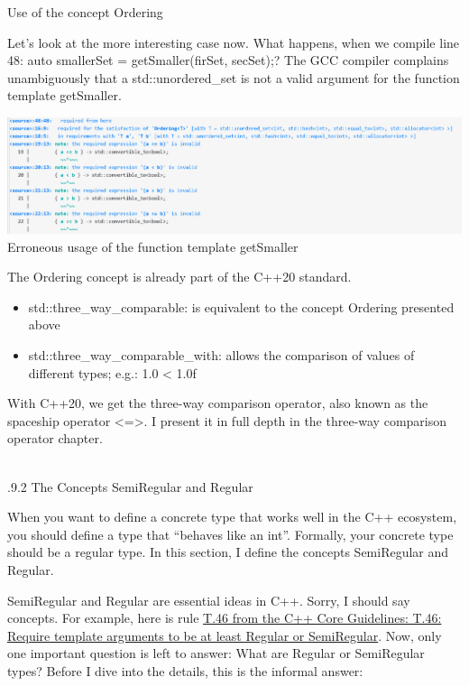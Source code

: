 \begin{center}
Use of the concept Ordering
\end{center}

Let’s look at the more interesting case now. What happens, when we compile line 48: auto smallerSet = getSmaller(firSet, secSet);? The GCC compiler complains unambiguously that a std::unordered\_set is not a valid argument for the function template getSmaller.

\begin{center}
\includegraphics[width=1.0\textwidth]{content/3/chapter4/images/1-5.png}\\
Erroneous usage of the function template getSmaller
\end{center}

The Ordering concept is already part of the C++20 standard.

\begin{itemize}
\item 
std::three\_way\_comparable: is equivalent to the concept Ordering presented above

\item 
std::three\_way\_comparable\_with: allows the comparison of values of different types; e.g.: 1.0 < 1.0f
\end{itemize}

With C++20, we get the three-way comparison operator, also known as the spaceship operator <=>. I present it in full depth in the three-way comparison operator chapter.

\hspace*{\fill} \\ %
.9.2\hspace{0.2cm} The Concepts SemiRegular and Regular

When you want to define a concrete type that works well in the C++ ecosystem, you should define a type that “behaves like an int”. Formally, your concrete type should be a regular type. In this section, I define the concepts SemiRegular and Regular.

SemiRegular and Regular are essential ideas in C++. Sorry, I should say concepts. For example, here is rule \href{http://isocpp.github.io/CppCoreGuidelines/CppCoreGuidelines#Rt-regular}{T.46 from the C++ Core Guidelines: T.46: Require template arguments to be at least Regular or SemiRegular}. Now, only one important question is left to answer: What are Regular or SemiRegular types? Before I dive into the details, this is the informal answer:

